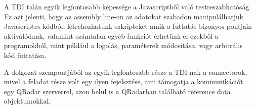 A TDI talán egyik legfontosabb képessége a Javascriptből való testreszabhatóság. Ez azt jelenti, hogy az assembly line-on az adatokat szabadon manipulálhatjuk Javascriptes kódból, létrehozhatunk szkripteket amik a futtatás bizonyos pontjain aktiválódnak, valamint számtalan egyéb funkciót érhetünk el ezekből a programokból, mint például a logolás, paraméterek módosítása, vagy arbitrális kód futtatása.

A dolgozat szempontjából az egyik legfontosabb része a TDI-nak a connectorok, mivel a feladat része volt egy ilyen fejelsztése, ami támogatja a kommunikációt egy QRadar szerverrel, azon belül is a QRadarban található reference data objektumokkal.
